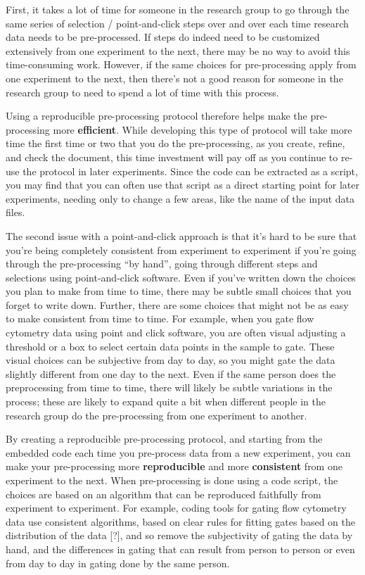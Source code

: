 \documentclass[]{tufte-book}
\begin{document}
First, it takes a lot of time for someone in the research group to go through
the same series of selection / point-and-click steps over and over each time
research data needs to be pre-processed. If steps do indeed need to be
customized extensively from one experiment to the next, there may be no way to
avoid this time-consuming work. However, if the same choices for pre-processing
apply from one experiment to the next, then there's not a good reason for
someone in the research group to need to spend a lot of time with this process.

Using a reproducible pre-processing protocol therefore helps make the
pre-processing more \textbf{efficient}. While developing this type of protocol will
take more time the first time or two that you do the pre-processing, as you
create, refine, and check the document, this time investment will pay off as you
continue to re-use the protocol in later experiments. Since the code can be
extracted as a script, you may find that you can often use that script as a
direct starting point for later experiments, needing only to change a few areas,
like the name of the input data files.

The second issue with a point-and-click approach is that it's hard to be sure
that you're being completely consistent from experiment to experiment if you're
going through the pre-processing ``by hand'', going through different steps and
selections using point-and-click software. Even if you've written down the
choices you plan to make from time to time, there may be subtle small choices
that you forget to write down. Further, there are some choices that might not be
as easy to make consistent from time to time. For example, when you gate flow
cytometry data using point and click software, you are often visual adjusting a
threshold or a box to select certain data points in the sample to gate. These
visual choices can be subjective from day to day, so you might gate the data
slightly different from one day to the next. Even if the same person does the
preprocessing from time to time, there will likely be subtle variations in the
process; these are likely to expand quite a bit when different people in the
research group do the pre-processing from one experiment to another.

By creating a reproducible pre-processing protocol, and starting from the
embedded code each time you pre-process data from a new experiment, you can
make your pre-processing more \textbf{reproducible} and more \textbf{consistent} from
one experiment to the next. When pre-processing is done using a code script,
the choices are based on an algorithm that can be reproduced faithfully from
experiment to experiment. For example, coding tools for gating flow cytometry
data use consistent algorithms, based on clear rules for fitting gates based
on the distribution of the data {[}?{]}, and so remove the subjectivity of
gating the data by hand, and the differences in gating that can result from
person to person or even from day to day in gating done by the same person.
\end{document}
